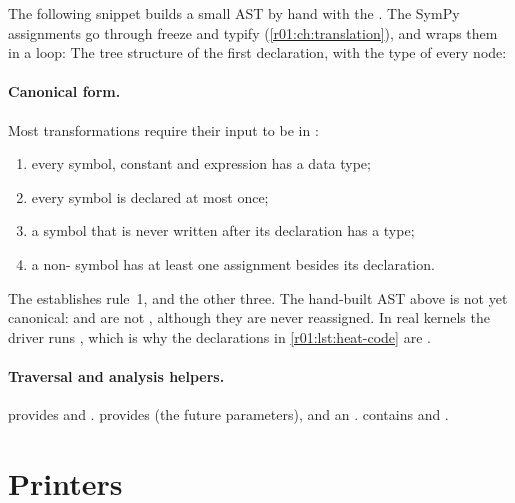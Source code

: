 The following snippet builds a small AST by hand with the . The SymPy
assignments go through freeze and typify (\cref{r01:ch:translation}), and  wraps
them in a loop:
The tree structure of the first declaration, with the type of every node:

\paragraph{Canonical form.}
Most transformations require their input to be in :
\begin{enumerate}
  \item every symbol, constant and expression has a data type;
  \item every symbol is declared at most once;
  \item a symbol that is never written after its declaration has a  type;
  \item a non- symbol has at least one assignment besides its declaration.
\end{enumerate}
The  establishes rule~1, and  the other three.
The hand-built AST above is not yet canonical:  and  are not
, although they are never reassigned. In real kernels the driver runs
, which is why the declarations in \cref{r01:lst:heat-code} are
.

\paragraph{Traversal and analysis helpers.}
 provides  and .
 provides  (the future
parameters),  and an .
 contains  and
.

\section{Printers}

